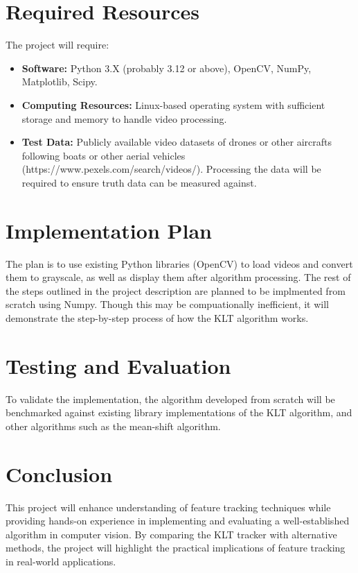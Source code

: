 \documentclass[journal]{IEEEtran}
\begin{document}
\section{Required Resources}
The project will require:
\begin{itemize}
    \item \textbf{Software:} Python 3.X (probably 3.12 or above), OpenCV, NumPy, Matplotlib, Scipy.
    \item \textbf{Computing Resources:} Linux-based operating system with sufficient storage and memory to handle video processing.
    \item \textbf{Test Data:} Publicly available video datasets of drones or other aircrafts following boats or other aerial vehicles (https://www.pexels.com/search/videos/). Processing the data will be required to ensure truth data can be measured against.
\end{itemize}

\section{Implementation Plan}
The plan is to use existing Python libraries (OpenCV) to load videos and convert them to grayscale, as well as display them after algorithm processing. The rest of the steps outlined in the project description are planned to be implmented from scratch using Numpy. Though this may be compuationally inefficient, it will demonstrate the step-by-step process of how the KLT algorithm works.

\section{Testing and Evaluation}
To validate the implementation, the algorithm developed from scratch will be benchmarked against existing library implementations of the KLT algorithm, and other algorithms such as the mean-shift algorithm.

\section{Conclusion}
This project will enhance understanding of feature tracking techniques while providing hands-on experience in implementing and evaluating a well-established algorithm in computer vision. By comparing the KLT tracker with alternative methods, the project will highlight the practical implications of feature tracking in real-world applications.
\end{document}
